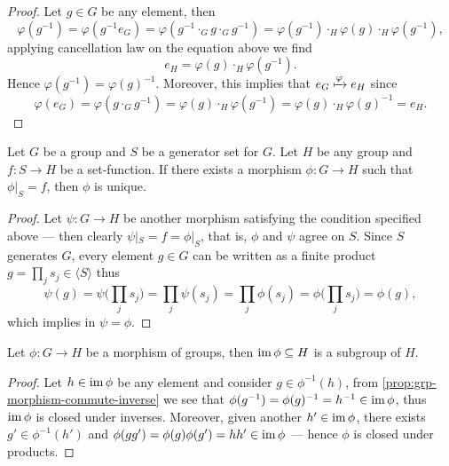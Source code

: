 \begin{proof}
    Let \(g \in G\) be any element, then
    \[
        \varphi(g^{-1}) = \varphi(g^{-1} e_G) = \varphi(g^{-1} \cdot_G g
        \cdot_G g^{-1}) = \varphi(g^{-1}) \cdot_H \varphi(g) \cdot_H
        \varphi(g^{-1}),
    \]
    applying cancellation law on the equation above we find
    \[
        e_H = \varphi(g) \cdot_H \varphi(g^{-1}).
    \]
    Hence \(\varphi(g^{-1}) = {\varphi(g)}^{-1}\). Moreover, this implies that \(e_G
    \xmapsto \varphi e_H\) since
    \[
        \varphi(e_G) = \varphi(g \cdot_G g^{-1}) = \varphi(g) \cdot_H
        \varphi(g^{-1}) = \varphi(g) \cdot_H {\varphi(g)}^{-1} = e_H.
    \]
\end{proof}

\begin{proposition}
    \label{prop:generator-unique-extension}
    Let \(G\) be a group and \(S\) be a generator set for \(G\). Let \(H\) be any
    group and \(f: S \to H\) be a set-function. If there exists a morphism \(\phi: G
    \to H\) such that \(\phi|_S = f\), then \(\phi\) is unique.
\end{proposition}

\begin{proof}
    Let \(\psi: G \to H\) be another morphism satisfying the condition specified
    above --- then clearly \(\psi|_S = f = \phi|_{S}\), that is, \(\phi\) and
    \(\psi\) agree on \(S\). Since \(S\) generates \(G\), every element \(g \in G\)
    can be written as a finite product \(g = \prod_{j} s_j \in \langle S \rangle\)
    thus
    \[
        \psi(g) = \psi\Big( \prod_j s_j \Big)
        = \prod_j \psi(s_j) = \prod_j \phi(s_j)
        = \phi\Big( \prod_j s_j \Big) = \phi(g),
    \]
    which implies in \(\psi = \phi\).
\end{proof}

\begin{proposition}
    \label{prop:morphism-image-subgroup}
    Let \(\phi: G \to H\) be a morphism of groups, then \(\operatorname{im} \phi \subseteq H\) is
    a subgroup of \(H\).
\end{proposition}

\begin{proof}
    Let \(h \in \operatorname{im} \phi\) be any element and consider \(g \in \phi^{-1}(h)\), from
    \cref{prop:grp-morphism-commute-inverse} we see that \(\phi(g^{-1}) =
    \phi(g)^{-1} = h^{-1} \in \operatorname{im} \phi\), thus \(\operatorname{im} \phi\) is closed under
    inverses. Moreover, given another \(h' \in \operatorname{im} \phi\), there exists \(g' \in
    \phi^{-1}(h')\) and \(\phi(g g') = \phi(g) \phi(g') = h h' \in \operatorname{im} \phi\) ---
    hence \(\phi\) is closed under products.
\end{proof}

